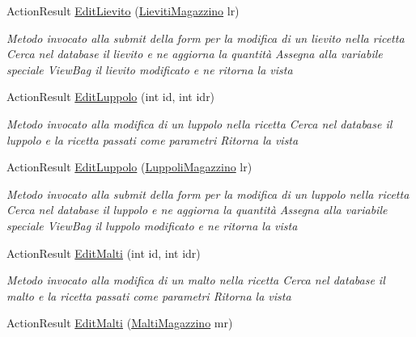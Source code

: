 \begin{DoxyCompactItemize}
Action\+Result \mbox{\hyperlink{class_brew_day2_1_1_controllers_1_1_magazzino_controller_a77226fc3fd21b9965da8c4477951f375}{Edit\+Lievito}} (\mbox{\hyperlink{class_brew_day2_1_1_models_1_1_lieviti_magazzino}{Lieviti\+Magazzino}} lr)
\begin{DoxyCompactList}\small\item\em Metodo invocato alla submit della form per la modifica di un lievito nella ricetta Cerca nel database il lievito e ne aggiorna la quantità Assegna alla variabile speciale View\+Bag il lievito modificato e ne ritorna la vista \end{DoxyCompactList}\item 
Action\+Result \mbox{\hyperlink{class_brew_day2_1_1_controllers_1_1_magazzino_controller_aaa423ee90c20e0e1d4848f4ee9d65c1c}{Edit\+Luppolo}} (int id, int idr)
\begin{DoxyCompactList}\small\item\em Metodo invocato alla modifica di un luppolo nella ricetta Cerca nel database il luppolo e la ricetta passati come parametri Ritorna la vista \end{DoxyCompactList}\item 
Action\+Result \mbox{\hyperlink{class_brew_day2_1_1_controllers_1_1_magazzino_controller_a2c5b33fb870d1b3a130d0c9a3208bccc}{Edit\+Luppolo}} (\mbox{\hyperlink{class_brew_day2_1_1_models_1_1_luppoli_magazzino}{Luppoli\+Magazzino}} lr)
\begin{DoxyCompactList}\small\item\em Metodo invocato alla submit della form per la modifica di un luppolo nella ricetta Cerca nel database il luppolo e ne aggiorna la quantità Assegna alla variabile speciale View\+Bag il luppolo modificato e ne ritorna la vista \end{DoxyCompactList}\item 
Action\+Result \mbox{\hyperlink{class_brew_day2_1_1_controllers_1_1_magazzino_controller_a591ba03e7b1d7ab34171e3f84ac15a19}{Edit\+Malti}} (int id, int idr)
\begin{DoxyCompactList}\small\item\em Metodo invocato alla modifica di un malto nella ricetta Cerca nel database il malto e la ricetta passati come parametri Ritorna la vista \end{DoxyCompactList}\item 
Action\+Result \mbox{\hyperlink{class_brew_day2_1_1_controllers_1_1_magazzino_controller_a898f64cc8e955db12ca1f12ed288b67b}{Edit\+Malti}} (\mbox{\hyperlink{class_brew_day2_1_1_models_1_1_malti_magazzino}{Malti\+Magazzino}} mr)

\end{DoxyCompactItemize}
